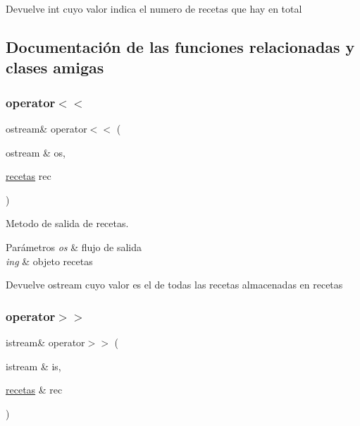 \begin{DoxyReturn}{Devuelve}
int cuyo valor indica el numero de recetas que hay en total 
\end{DoxyReturn}


\subsection{Documentación de las funciones relacionadas y clases amigas}
\mbox{\label{classrecetas_a6d22e5920fcf4c27d4bc01fc88c6bd84}} 
\subsubsection{\texorpdfstring{operator$<$$<$}{operator<<}}
{\footnotesize\ttfamily ostream\& operator$<$$<$ (\begin{DoxyParamCaption}\item[{ostream \&}]{os,  }\item[{\hyperlink{classrecetas}{recetas}}]{rec }\end{DoxyParamCaption})\hspace{0.3cm}{\ttfamily [friend]}}



Metodo de salida de recetas. 


\begin{DoxyParams}{Parámetros}
{\em os} & flujo de salida \\
\hline
{\em ing} & objeto recetas \\
\hline
\end{DoxyParams}
\begin{DoxyReturn}{Devuelve}
ostream cuyo valor es el de todas las recetas almacenadas en recetas 
\end{DoxyReturn}
\mbox{\label{classrecetas_ad812452076c1f84b23969bc5983e0977}} 
\subsubsection{\texorpdfstring{operator$>$$>$}{operator>>}}
{\footnotesize\ttfamily istream\& operator$>$$>$ (\begin{DoxyParamCaption}\item[{istream \&}]{is,  }\item[{\hyperlink{classrecetas}{recetas} \&}]{rec }\end{DoxyParamCaption})\hspace{0.3cm}{\ttfamily [friend]}}



